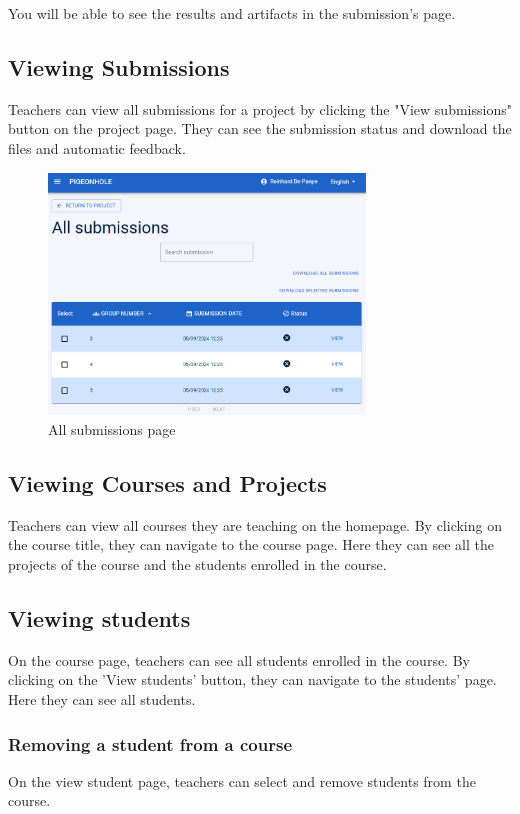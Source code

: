 \documentclass{article}
\begin{document}
You will be able to see the results and artifacts in the submission's page.

\subsection{Viewing Submissions}
Teachers can view all submissions for a project by clicking the "View submissions" button on the project page. They can see the submission status and download the files and automatic feedback.

\begin{figure}[H]
    \centering
    \includegraphics[width=0.75\textwidth]{images/all_submissions.png}
    \caption{All submissions page}
\end{figure}


\subsection{Viewing Courses and Projects}
Teachers can view all courses they are teaching on the homepage. By clicking on the course title, they can navigate to the course page. Here they can see all the projects of the course and the students enrolled in the course.

\subsection{Viewing students}
On the course page, teachers can see all students enrolled in the course. By clicking on the 'View students' button, they can navigate to the students' page. Here they can see all students.

\subsubsection{Removing a student from a course} 
On the view student page, teachers can select and remove students from the course.
\end{document}
